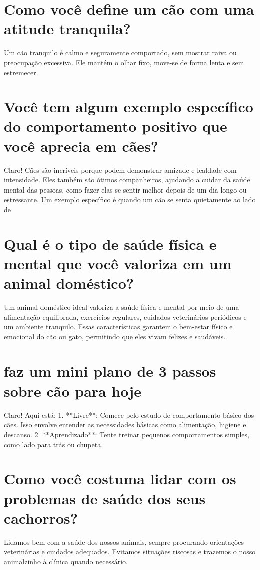 \documentclass[11pt,a4paper]{article}
\begin{document}
\section{Como você define um cão com uma atitude tranquila?}
Um cão tranquilo é calmo e seguramente comportado, sem mostrar raiva ou preocupação excessiva. Ele mantém o olhar fixo, move-se de forma lenta e sem estremecer.

\section{Você tem algum exemplo específico do comportamento positivo que você aprecia em cães?}
Claro! Cães são incríveis porque podem demonstrar amizade e lealdade com intensidade. Eles também são ótimos companheiros, ajudando a cuidar da saúde mental das pessoas, como fazer elas se sentir melhor depois de um dia longo ou estressante. Um exemplo específico é quando um cão se senta quietamente ao lado de

\section{Qual é o tipo de saúde física e mental que você valoriza em um animal doméstico?}
Um animal doméstico ideal valoriza a saúde física e mental por meio de uma alimentação equilibrada, exercícios regulares, cuidados veterinários periódicos e um ambiente tranquilo. Essas características garantem o bem-estar físico e emocional do cão ou gato, permitindo que eles vivam felizes e saudáveis.

\section{faz um mini plano de 3 passos sobre cão para hoje}
Claro! Aqui está: 1. **Livre**: Comece pelo estudo de comportamento básico dos cães. Isso envolve entender as necessidades básicas como alimentação, higiene e descanso. 2. **Aprendizado**: Tente treinar pequenos comportamentos simples, como lado para trás ou chupeta.

\section{Como você costuma lidar com os problemas de saúde dos seus cachorros?}
Lidamos bem com a saúde dos nossos animais, sempre procurando orientações veterinárias e cuidados adequados. Evitamos situações riscosas e trazemos o nosso animalzinho à clínica quando necessário.
\end{document}
